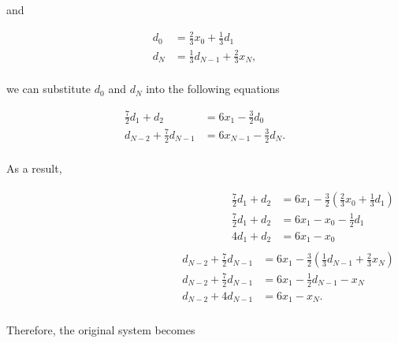 \documentclass[paper=a4, fontsize=11pt]{scrartcl} %
\begin{document}
and 

\begin{align*}
    d_{0} &= \frac{2}{3} x_{0} + \frac{1}{3} d_{1}\\
    d_{N} &= \frac{1}{3} d_{N-1} + \frac{2}{3} x_{N},\\
\end{align*}

we can substitute $d_{0}$ and $d_{N}$ into the following equations

\begin{align*}
    \frac{7}{2}d_{1} + d_{2} &= 6x_{1} - \frac{3}{2}d_{0}\\
    d_{N-2} + \frac{7}{2}d_{N-1}  &= 6x_{N-1} - \frac{3}{2}d_{N}.\\
\end{align*}

As a result,

\begin{align*}
    \begin{split}
        \frac{7}{2}d_{1} + d_{2} &= 6x_{1} - \frac{3}{2}\left( \frac{2}{3} x_{0} + \frac{1}{3} d_{1} \right)\\
        \frac{7}{2}d_{1} + d_{2} &= 6x_{1} - x_{0} - \frac{1}{2} d_{1}\\
        4d_{1} + d_{2} &= 6x_{1} - x_{0}\\
    \end{split}
    \begin{split}
        d_{N-2} + \frac{7}{2}d_{N-1} &= 6x_{1} - \frac{3}{2}\left( \frac{1}{3} d_{N-1} + \frac{2}{3} x_{N} \right)\\
        d_{N-2} + \frac{7}{2}d_{N-1} &= 6x_{1} - \frac{1}{2} d_{N-1} - x_{N}\\
        d_{N-2} + 4d_{N-1} &= 6x_{1} - x_{N}.\\
    \end{split}
\end{align*}

Therefore, the original system becomes
\end{document}
